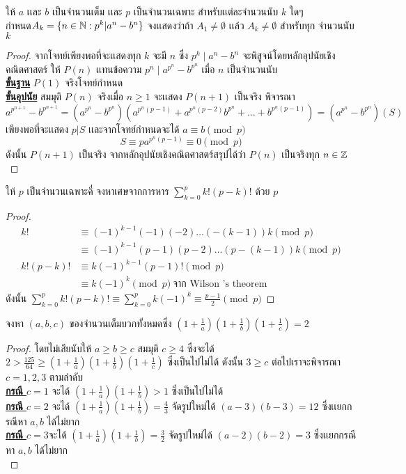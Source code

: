 \documentclass[a4paper,12pt]{scrartcl}
\begin{document}
	\begin{example}
		ให้ $a$ เเละ $b$ เป็นจำนวนเต็ม เเละ $p$   เป็นจำนวนเฉพาะ สำหรับเเต่ละจำนวนนับ $k$ ใดๆ\\ กำหนด$ A_k = \{ n \in \mathbb N : p^k | a^n-b^n \}$ จงเเสดงว่าถ้า $A_1 \neq \emptyset$ เเล้ว $A_k \neq \emptyset$ สำหรับทุก จำนวนนับ $k$
	\end{example}
	\begin{proof}
		จากโจทย์เพียงพอที่จะเเสดงทุก $k$ จะมี $n$ ซึ่ง $p^k \mid a^n-b^n$ จะพิสูจน์โดยหลักอุปนัยเชิงคณิตศาสตร์ ให้ $P(n)$ เเทนข้อความ $p^n \mid a^{p^n}-b^{p^n}$ เมื่อ $n$ เป็นจำนวนนับ \\
		\underline{\textbf{ขั้นฐาน}} $P(1)$ จริงโจทย์กำหนด \\
		\underline{\textbf{ขั้นอุปนัย}} สมมุติ $P(n)$ จริงเมื่อ $n \ge 1$ จะเเสดง $P(n+1)$ เป็นจริง พิจารณา \[a^{p^{n+1}}-b^{p^{n+1}} = (a^{p^n}-b^{p^n})(a^{p^n(p-1)}+a^{p^n(p-2)}b^{p^n} + \dots + b^{p^n(p-1)}) = (a^{p^n}-b^{p^n})(S)
		\]
		เพียงพอที่จะเเสดง $p|S$ เเละจากโจทย์กำหนดจะได้ $a \equiv b \pmod p$
		\[	S \equiv pa^{p^{n}(p-1)} \equiv 0 \pmod p \] 
		ดังนั้น $P(n+1)$ เป็นจริง จากหลักอุปนัยเชิงคณิตศาสตร์สรุปได้ว่า $P(n)$ เป็นจริงทุก $n \in \mathbb Z$
		
	\end{proof}
	\begin{example}
		ให้ $p$ เป็นจำนวนเฉพาะคี่ จงหาเศษจากการหาร $ \displaystyle \sum_{k=0}^{p}k!(p-k)!$ ด้วย $p$
	\end{example}
\begin{proof}
	\begin{align*}
		k! &\equiv (-1)^{k-1} (-1)(-2) \dots (-(k-1))k \pmod p \\
		& \equiv (-1)^{k-1} (p-1)(p-2) \dots (p-(k-1))k  \pmod p \\
		k!(p-k)! & \equiv k(-1)^{k-1} (p-1)! \pmod p \\
		& \equiv k(-1)^k \pmod p  \: \textrm{จาก Wilson 's theorem}
	\end{align*}
ดังนั้น $\sum_{k=0}^{p}k!(p-k)! \equiv \sum_{k=0}^{p} k(-1)^k \equiv \frac{p-1}{2} \pmod p$ 
\end{proof}

	\begin{example}
		จงหา $(a,b,c)$ ของจำนวนเต็มบวกทั้งหมดซึ่ง $(1+\frac{1}{a})(1+\frac{1}{b})(1+\frac{1}{c}) = 2$
	\end{example}
\begin{proof}
	โดยไม่เสียนับให้ $a \ge b \ge c$ สมมุติ $c \ge 4$ ซึ่งจะได้ 
	$ 2>\frac{125}{64} \ge(1+\frac{1}{a})(1+\frac{1}{b})(1+\frac{1}{c})$ ซึ่งเป็นไปไม่ได้ ดังนั้น  $3 \ge c$ ต่อไปเราจะพิจารณา $c=1,2,3$ ตามลำดับ \\
	\underline{\textbf{กรณี $c=1$}} จะได้ $(1+\frac{1}{a})(1+\frac{1}{b}) > 1$ ซึ่งเป็นไปไม่ได้ \\
	\underline{\textbf{กรณี $c=2$}} จะได้ $(1+\frac{1}{a})(1+\frac{1}{b}) = \frac{4}{3}$ จัดรูปใหม่ได้ $(a-3)(b-3) = 12$ ซึ่งเเยกกรณีหา $a,b$ ได้ไม่ยาก \\
	\underline{\textbf{กรณี $c=3$}}จะได้ $(1+\frac{1}{a})(1+\frac{1}{b}) = \frac{3}{2}$ จัดรูปใหม่ได้ $(a-2)(b-2) = 3$ ซึ่งเเยกกรณีหา $a,b$ ได้ไม่ยาก \\
	
\end{proof}
\end{document}
